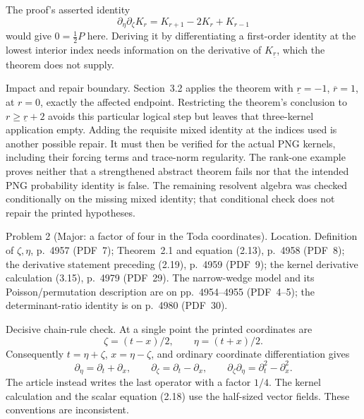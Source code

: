 \documentclass[10pt]{article}
\begin{document}
The proof’s asserted identity \[\partial_\eta\partial_\zeta K_r=K_{r+1}-2K_r+K_{r-1}
\tag{3.4 in the article}\] would give \(0=\tfrac12P\) here. Deriving it by differentiating a first-order identity at the lowest interior index needs information on the derivative of \(K_{\underline r}\), which the theorem does not supply.\par
Impact and repair boundary. Section 3.2 applies the theorem with \(\underline r=-1\), \(\overline r=1\), at \(r=0\), exactly the affected endpoint. Restricting the theorem’s conclusion to \(r\geq\underline r+2\) avoids this particular logical step but leaves that three-kernel application empty. Adding the requisite mixed identity at the indices used is another possible repair. It must then be verified for the actual PNG kernels, including their forcing terms and trace-norm regularity. The rank-one example proves neither that a strengthened abstract theorem fails nor that the intended PNG probability identity is false. The remaining resolvent algebra was checked conditionally on the missing mixed identity; that conditional check does not repair the printed hypotheses.\par
Problem 2 (Major: a factor of four in the Toda coordinates).  Location. Definition of \(\zeta,\eta\), p. 4957 (PDF 7); Theorem 2.1 and equation (2.13), p. 4958 (PDF 8); the derivative statement preceding (2.19), p. 4959 (PDF 9); the kernel derivative calculation (3.15), p. 4979 (PDF 29). The narrow-wedge model and its Poisson/permutation description are on pp. 4954–4955 (PDF 4–5); the determinant-ratio identity is on p. 4980 (PDF 30).\par
Decisive chain-rule check. At a single point the printed coordinates are \[\zeta=(t-x)/2,\qquad \eta=(t+x)/2.\] Consequently \(t=\eta+\zeta\), \(x=\eta-\zeta\), and ordinary coordinate differentiation gives \[\partial_\eta=\partial_t+\partial_x,\qquad
\partial_\zeta=\partial_t-\partial_x,\qquad
\partial_\zeta\partial_\eta=\partial_t^2-\partial_x^2.\] The article instead writes the last operator with a factor \(1/4\). The kernel calculation and the scalar equation (2.18) use the half-sized vector fields. These conventions are inconsistent.\par
\end{document}
